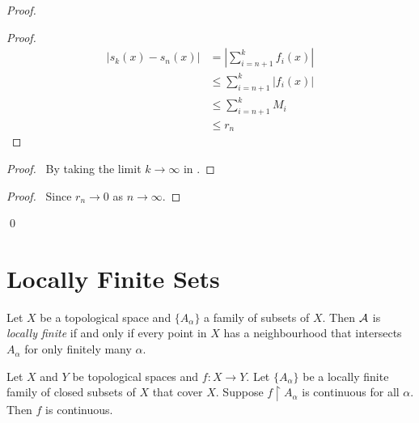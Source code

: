 \begin{proof}
    \pf
    \begin{proof}
        \pf
        \begin{align*}
            |s_k(x) - s_n(x)| & = |\sum_{i=n+1}^k f_i(x)| \\
            & \leq \sum_{i=n+1}^k |f_i(x)| \\
            & \leq \sum_{i=n+1}^k M_i \\
            & \leq r_n
        \end{align*}
    \end{proof}
    \begin{proof}
        \pf\ By taking the limit $k \rightarrow \infty$ in .
    \end{proof}
    \qedstep
    \begin{proof}
        \pf\ Since $r_n \rightarrow 0$ as $n \rightarrow \infty$.
    \end{proof}
    \qed
\end{proof}

\section{Locally Finite Sets}

\begin{definition}
    Let $X$ be a topological space and $\{ A_\alpha \}$ a family of subsets of $X$. Then $\AA$ is \emph{locally finite} if and only if every point in $X$ has a neighbourhood that
    intersects $A_\alpha$ for only finitely many $\alpha$.
\end{definition}

\begin{theorem}
    Let $X$ and $Y$ be topological spaces and $f : X \rightarrow Y$. Let $\{ A_\alpha \}$ be a locally finite family of closed subsets of $X$ that cover $X$. Suppose $f \restriction A_\alpha$
    is continuous for all $\alpha$. Then $f$ is continuous.
\end{theorem}

